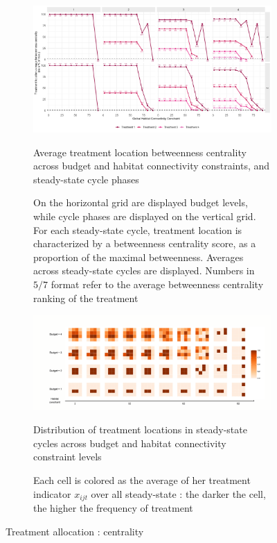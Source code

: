 \begin{figure}
     \centering
     \begin{subfigure}[b]{\textwidth}
         \centering
         \includegraphics[width=\textwidth]{figures/wildland/betweenness_treatment.jpg}
         \caption{Average treatment location betweenness centrality across budget and habitat connectivity constraints, and steady-state cycle phases}
         \caption*{On the horizontal grid are displayed budget levels, while cycle phases are displayed on the vertical grid. For each steady-state cycle, treatment location is characterized by a betweenness centrality score, as a proportion of the maximal betweenness. Averages across steady-state cycles are displayed. Numbers in $5/7$ format refer to the average betweenness centrality ranking of the treatment} 
         \label{fig:between}
     \end{subfigure}
     \begin{subfigure}[b]{\textwidth}
              \centering
		\includegraphics[width=\textwidth]{figures/wildland/average_treatments_legend.pdf}
    		  \caption{Distribution of treatment locations in steady-state cycles across budget and habitat connectivity constraint levels}
    		  \caption*{Each cell is colored as the average of her treatment indicator $x_{ijt}$ over all steady-state : the darker the cell, the higher the frequency of treatment}
     \label{fig:treatments_location}
     \end{subfigure}
     \caption{Treatment allocation : centrality}
     \label{fig:centrality}
\end{figure}


